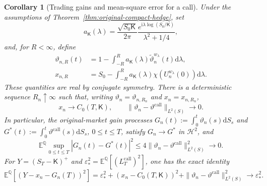 \documentclass[11pt]{article}
\newtheorem{corollary}[theorem]{Corollary}
\theoremstyle{definition}
\theoremstyle{remark}
\newcommand{\E}{\mathbb{E}}
\newcommand{\Q}{\mathbb{Q}}
\newcommand{\1}{\mathbf{1}}
\newcommand{\dd}{\mathrm{d}}
\newcommand{\cK}{\mathsf{K}}
\begin{document}
\begin{corollary}[Trading gains and mean-square error for a call]
\label{cor:original-call-stability}
Under the assumptions of Theorem~\ref{thm:original-compact-hedge}, set
\[
 a_{\cK}(\lambda)=\frac{\sqrt{S_0\cK}}{2\pi}
 \frac{e^{\mathrm{i}\lambda\log(S_0/\cK)}}{\lambda^2+1/4},
\]
and, for $R<\infty$, define
\begin{align}
 \vartheta_{n,R}(t)&=1-\int_{-R}^R
              a_{\cK}(\lambda)\widetilde\vartheta_n^{w_\lambda}(t)\dd\lambda,
              \label{eq:original-call-approx}\\
 x_{n,R}&=S_0-\int_{-R}^R
              a_{\cK}(\lambda)\chi(U_n^{w_\lambda}(0))\dd\lambda.
              \label{eq:original-call-capital}
\end{align}
These quantities are real by conjugate symmetry. There is a deterministic
sequence $R_n\uparrow\infty$ such that, writing
$\vartheta_n=\vartheta_{n,R_n}$ and $x_n=x_{n,R_n}$,
\[
 x_n\longrightarrow C_0(T,\cK),\qquad
 \|\vartheta_n-\vartheta^{\mathrm{call}}\|_{L^2(S)}\longrightarrow0.
\]
In particular, the original-market gain processes
$G_n(t):=\int_0^t\vartheta_n(s)\dd S_s$ and
$G^*(t):=\int_0^t\vartheta^{\mathrm{call}}(s)\dd S_s$, $0\leq t\leq T$,
satisfy $G_n\to G^*$ in $\mathcal H^2$, and
\begin{equation}
\label{eq:original-uniform-gains}
 \E^\Q\sup_{0\leq t\leq T}|G_n(t)-G^*(t)|^2
 \leq4\|\vartheta_n-\vartheta^{\mathrm{call}}\|_{L^2(S)}^2\longrightarrow0.
\end{equation}
For $Y=(S_T-\cK)^+$ and
$\varepsilon_*^2=\E^\Q[(L_T^{\mathrm{call}})^2]$, one has the exact identity
\begin{equation}
\label{eq:original-excess-mse}
 \E^\Q[(Y-x_n-G_n(T))^2]
 =\varepsilon_*^2+(x_n-C_0(T,\cK))^2
       +\|\vartheta_n-\vartheta^{\mathrm{call}}\|_{L^2(S)}^2
 \longrightarrow\varepsilon_*^2.
\end{equation}
\end{corollary}
\end{document}
